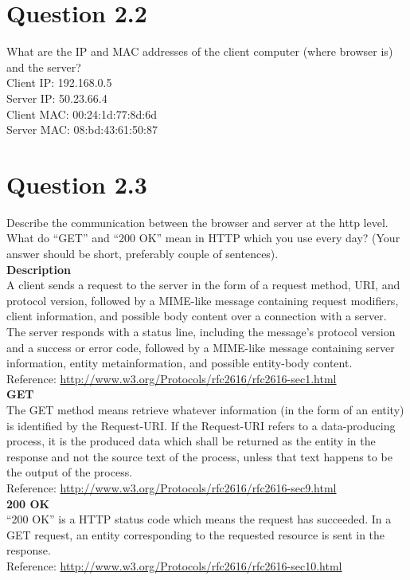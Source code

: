 \documentclass{article}
\newenvironment{homeworkProblem}[1]{
	\section*{#1}
	}{
}
\begin{document}

\begin{homeworkProblem}{Question 2.2}
What are the IP and MAC addresses of the client computer (where browser is) and the server?\\

Client IP: 192.168.0.5\\
Server IP: 50.23.66.4\\

Client MAC: 00:24:1d:77:8d:6d\\
Server MAC: 08:bd:43:61:50:87
\end{homeworkProblem}


\begin{homeworkProblem}{Question 2.3}
Describe the communication between the browser and server at the http level. What do ``GET'' and ``200 OK'' mean in HTTP which you use every day? (Your answer should be short, preferably couple of sentences).\\

\textbf{Description}\\
A client sends a request to the server in the form of a request method, URI, and protocol version, followed by a MIME-like message containing request modifiers, client information, and possible body content over a connection with a server. The server responds with a status line, including the message's protocol version and a success or error code, followed by a MIME-like message containing server information, entity metainformation, and possible entity-body content.\\

Reference: \url{http://www.w3.org/Protocols/rfc2616/rfc2616-sec1.html}\\

\textbf{GET}\\
The GET method means retrieve whatever information (in the form of an entity) is identified by the Request-URI. If the Request-URI refers to a data-producing process, it is the produced data which shall be returned as the entity in the response and not the source text of the process, unless that text happens to be the output of the process.\\

Reference: \url{http://www.w3.org/Protocols/rfc2616/rfc2616-sec9.html}\\

\textbf{200 OK}\\
``200 OK'' is a HTTP status code which means the request has succeeded. In a GET request, an entity corresponding to the requested resource is sent in the response.\\

Reference: \url{http://www.w3.org/Protocols/rfc2616/rfc2616-sec10.html}
\end{homeworkProblem}
\end{document}
